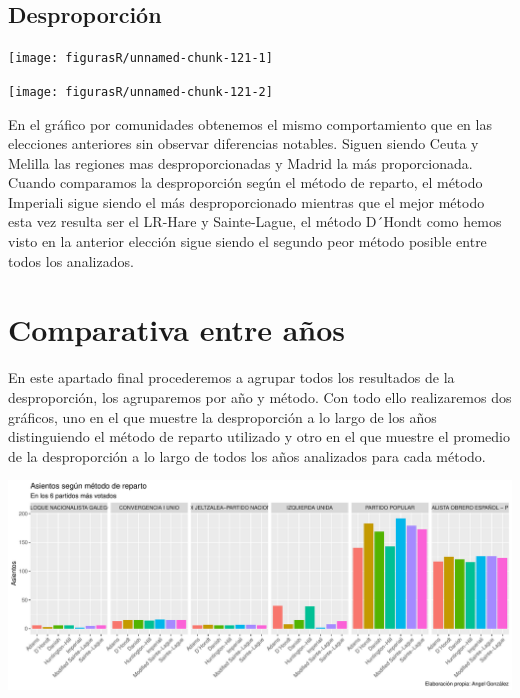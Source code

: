 \documentclass[12pt,a4paper,]{book}
\numberwithin{dummy}{section}
\theoremstyle{ocrenumbox}
\theoremstyle{blacknumex}
\theoremstyle{blacknumbox}
\theoremstyle{ocrenum}
\theoremstyle{ocrenum}
\begin{document}
\hypertarget{desproporciuxf3n-14}{%
\subsection{Desproporción}\label{desproporciuxf3n-14}}

\begin{center}\texttt{[image: figurasR/unnamed-chunk-121-1]} \end{center}

\begin{center}\texttt{[image: figurasR/unnamed-chunk-121-2]} \end{center}

En el gráfico por comunidades obtenemos el mismo comportamiento que en
las elecciones anteriores sin observar diferencias notables. Siguen
siendo Ceuta y Melilla las regiones mas desproporcionadas y Madrid la
más proporcionada.\\
Cuando comparamos la desproporción según el método de reparto, el método
Imperiali sigue siendo el más desproporcionado mientras que el mejor
método esta vez resulta ser el LR-Hare y Sainte-Lague, el método D´Hondt
como hemos visto en la anterior elección sigue siendo el segundo peor
método posible entre todos los analizados.

\hypertarget{comparativa-entre-auxf1os}{%
\section{Comparativa entre años}\label{comparativa-entre-auxf1os}}

En este apartado final procederemos a agrupar todos los resultados de la
desproporción, los agruparemos por año y método. Con todo ello
realizaremos dos gráficos, uno en el que muestre la desproporción a lo
largo de los años distinguiendo el método de reparto utilizado y otro en
el que muestre el promedio de la desproporción a lo largo de todos los
años analizados para cada método.

\begin{center}\includegraphics[width=1\linewidth]{figurasR/unnamed-chunk-122-1} \end{center}
\end{document}
